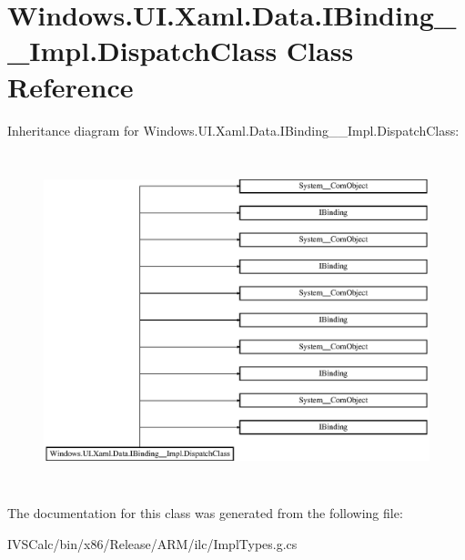 \hypertarget{class_windows_1_1_u_i_1_1_xaml_1_1_data_1_1_i_binding_____impl_1_1_dispatch_class}{}\section{Windows.\+U\+I.\+Xaml.\+Data.\+I\+Binding\+\_\+\+\_\+\+Impl.\+Dispatch\+Class Class Reference}
\label{class_windows_1_1_u_i_1_1_xaml_1_1_data_1_1_i_binding_____impl_1_1_dispatch_class}
Inheritance diagram for Windows.\+U\+I.\+Xaml.\+Data.\+I\+Binding\+\_\+\+\_\+\+Impl.\+Dispatch\+Class\+:\begin{figure}[H]
\begin{center}
\leavevmode
\includegraphics[height=9.746835cm]{class_windows_1_1_u_i_1_1_xaml_1_1_data_1_1_i_binding_____impl_1_1_dispatch_class}
\end{center}
\end{figure}


The documentation for this class was generated from the following file\+:\begin{DoxyCompactItemize}
\item 
I\+V\+S\+Calc/bin/x86/\+Release/\+A\+R\+M/ilc/Impl\+Types.\+g.\+cs\end{DoxyCompactItemize}
